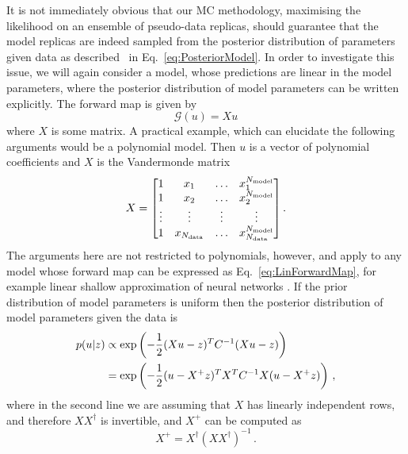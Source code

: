 It is not immediately obvious that our MC methodology, maximising the likelihood
on an ensemble of pseudo-data replicas, should guarantee that the model replicas
are indeed sampled from the posterior distribution of parameters given data as
described \eg\ in Eq.~\ref{eq:PosteriorModel}. In order to investigate this
issue, we will again consider a model, whose predictions are linear in the model
parameters, where the posterior distribution of model parameters can be written
explicitly. The forward map is given by
\begin{equation}\label{eq:LinForwardMap}
    \mathcal G(u) = X u
\end{equation}
where $X$ is some matrix. A practical example, which can elucidate the following
arguments would be a polynomial model. Then $u$ is a
vector of polynomial coefficients and $X$ is the Vandermonde matrix
\begin{equation}
    X =
    \begin{bmatrix}
        1  & x_1 & \ldots& x_1^{N_{\rm model}} \\ 
        1  & x_2 & \ldots& x_2^{N_{\rm model}} \\ 
        \vdots  & \vdots & \vdots& \vdots \\ 
        1  & x_{N_{\rm data}} & \ldots & x_{N_{\rm data}}^{N_{\rm model}} 
    \end{bmatrix}.
\end{equation}
The arguments here are not restricted to polynomials, however, and apply to
any model whose forward map can be expressed as Eq.~\eqref{eq:LinForwardMap},
for example linear shallow approximation of neural networks
\cite{ADVANI2020428}.
If the prior distribution of model parameters is uniform then the posterior
distribution of model parameters given the data is
\begin{equation}
    \label{eq:PosteriorMultiGaussModel}
    \begin{split}
        p(u | z) &\propto
        \exp \left( -\frac{1}{2} (Xu - z)^T C^{-1}_{} (Xu - z)\right) \\
        &= \exp \left( -\frac{1}{2} (u - X^+z)^T X^TC^{-1}_{}X (u - X^+z)\right)\, ,
    \end{split}
\end{equation}
where in the second line we are assuming that $X$ has linearly independent rows,
and therefore $X X^\dagger$ is invertible, and $X^+$ can be computed as
\begin{equation}
    \label{eq:RightInverse}
    X^+ = X^\dagger \left(X X^\dagger\right)^{-1}\, .
\end{equation}
